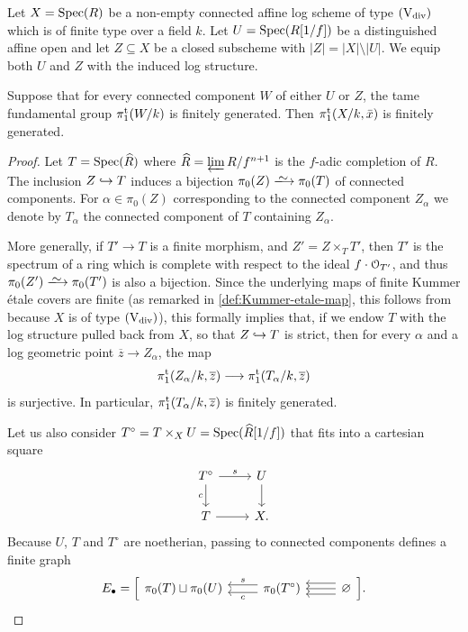 \begin{prop} \label{prop:pi1tame-strat}
    Let $X=\operatorname{Spec}(R)$ be a non-empty connected affine log scheme of type $(\mathrm{V}_{\rm div})$ which is of finite type over a field $k$. Let $U=\operatorname{Spec}(R[1/f])$ be a distinguished affine open and let $Z \subseteq X$ be a closed subscheme with $|Z| = |X|\setminus |U|$. We equip both $U$ and $Z$ with the induced log structure. 
    
    Suppose that for every connected component $W$ of either $U$ or $Z$, the tame fundamental group $\pi_1^{\mathrm{t}}(W/k)$ is finitely generated.     
    Then 
    $\pi_1^{\mathrm{t}}(X/k, \bar x)$ 
    is finitely generated. 
\end{prop}
\begin{proof}
Let $T = \operatorname{Spec}(\widehat{R})$ where $\widehat{R} = \varprojlim R/f^{n+1}$ is the $f$-adic completion of $R$. The inclusion $Z \hookrightarrow T$ induces a bijection $\pi_0(Z) \isomto \pi_0(T)$ of connected components. For $\alpha \in \pi_0(Z)$ corresponding to the connected component $Z_\alpha$  we denote by $T_\alpha$ the connected component of $T$ containing $Z_\alpha$. 

More generally, if $T'\to T$ is a finite morphism, and $Z' = Z\times_T T'$, then $T'$ is the spectrum of a ring which is complete with respect to the ideal $f\cdot {\mathcal O}_{T'}$, and thus $\pi_0(Z')\isomto\pi_0(T')$ is also a bijection. Since the underlying maps of finite Kummer \'etale covers are finite (as remarked in \cref{def:Kummer-etale-map}, this follows from \cite[Corollary~5.1.2]{AHLS-Log} because $X$ is of type $(\mathrm{V}_{\rm div})$), this formally implies that, if we endow $T$ with the log structure pulled back from $X$, so that $Z \hookrightarrow T$ is strict, then for every $\alpha$ and a log geometric point $\overline{z}\to Z_\alpha$, the map
\[
    \pi_1^{\mathrm{t}}(Z_\alpha/k, \overline{z})\longrightarrow\pi_1^{\mathrm{t}}(T_\alpha/k,\overline{z})
\]
is surjective. In particular, $\pi_1^{\mathrm{t}}(T_\alpha/k,\overline{z})$ is finitely generated. 


Let us also consider $T^\circ = T\times_X U = \operatorname{Spec}(\widehat{R}[1/f])$ that fits into a cartesian square
\[ 
    \begin{tikzcd}
        T^\circ \ar[r,"s"] \ar[d,"c",swap] & U \ar[d] \\
        T \ar[r] & X.
     \end{tikzcd}
\]
Because $U$, $T$ and $T^\circ$ are noetherian, passing to connected components defines a finite graph 
\[
    E_\bullet = \Big[\begin{tikzcd}
        \pi_0(T) \sqcup \pi_0(U) & \ar[l,"c",shift left=0.7ex] \ar[l,"s",swap,shift right=0.7ex] \pi_0(T^\circ) & \ar[l,shift left=1ex] \ar[l,shift right=1ex] \ar[l] \varnothing  
    \end{tikzcd}\Big].
\]


\end{proof}
